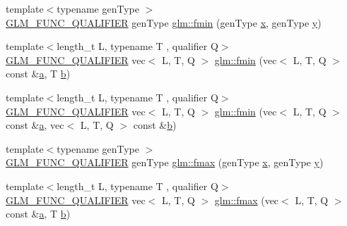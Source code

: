 \begin{DoxyCompactItemize}
\item 
{\footnotesize template$<$typename gen\+Type $>$ }\\\mbox{\hyperlink{setup_8hpp_a33fdea6f91c5f834105f7415e2a64407}{G\+L\+M\+\_\+\+F\+U\+N\+C\+\_\+\+Q\+U\+A\+L\+I\+F\+I\+ER}} gen\+Type \mbox{\hyperlink{group__gtx__extended__min__max_gaa3200559611ac5b9b9ae7283547916a7}{glm\+::fmin}} (gen\+Type \mbox{\hyperlink{_s_d_l__opengl_8h_ad0e63d0edcdbd3d79554076bf309fd47}{x}}, gen\+Type \mbox{\hyperlink{_s_d_l__opengl_8h_a1675d9d7bb68e1657ff028643b4037e3}{y}})
\item 
{\footnotesize template$<$length\+\_\+t L, typename T , qualifier Q$>$ }\\\mbox{\hyperlink{setup_8hpp_a33fdea6f91c5f834105f7415e2a64407}{G\+L\+M\+\_\+\+F\+U\+N\+C\+\_\+\+Q\+U\+A\+L\+I\+F\+I\+ER}} vec$<$ L, T, Q $>$ \mbox{\hyperlink{group__gtx__extended__min__max_gae989203363cff9eab5093630df4fe071}{glm\+::fmin}} (vec$<$ L, T, Q $>$ const \&\mbox{\hyperlink{_s_d_l__opengl__glext_8h_a3309789fc188587d666cda5ece79cf82}{a}}, T \mbox{\hyperlink{_s_d_l__opengl__glext_8h_a0f71581a41fd2264c8944126dabbd010}{b}})
\item 
{\footnotesize template$<$length\+\_\+t L, typename T , qualifier Q$>$ }\\\mbox{\hyperlink{setup_8hpp_a33fdea6f91c5f834105f7415e2a64407}{G\+L\+M\+\_\+\+F\+U\+N\+C\+\_\+\+Q\+U\+A\+L\+I\+F\+I\+ER}} vec$<$ L, T, Q $>$ \mbox{\hyperlink{group__gtx__extended__min__max_ga7c42e93cd778c9181d1cdeea4d3e43bd}{glm\+::fmin}} (vec$<$ L, T, Q $>$ const \&\mbox{\hyperlink{_s_d_l__opengl__glext_8h_a3309789fc188587d666cda5ece79cf82}{a}}, vec$<$ L, T, Q $>$ const \&\mbox{\hyperlink{_s_d_l__opengl__glext_8h_a0f71581a41fd2264c8944126dabbd010}{b}})
\item 
{\footnotesize template$<$typename gen\+Type $>$ }\\\mbox{\hyperlink{setup_8hpp_a33fdea6f91c5f834105f7415e2a64407}{G\+L\+M\+\_\+\+F\+U\+N\+C\+\_\+\+Q\+U\+A\+L\+I\+F\+I\+ER}} gen\+Type \mbox{\hyperlink{group__gtx__extended__min__max_gae5792cb2b51190057e4aea027eb56f81}{glm\+::fmax}} (gen\+Type \mbox{\hyperlink{_s_d_l__opengl_8h_ad0e63d0edcdbd3d79554076bf309fd47}{x}}, gen\+Type \mbox{\hyperlink{_s_d_l__opengl_8h_a1675d9d7bb68e1657ff028643b4037e3}{y}})
\item 
{\footnotesize template$<$length\+\_\+t L, typename T , qualifier Q$>$ }\\\mbox{\hyperlink{setup_8hpp_a33fdea6f91c5f834105f7415e2a64407}{G\+L\+M\+\_\+\+F\+U\+N\+C\+\_\+\+Q\+U\+A\+L\+I\+F\+I\+ER}} vec$<$ L, T, Q $>$ \mbox{\hyperlink{group__gtx__extended__min__max_gab380df808a15a6a23993e3475d1b94d2}{glm\+::fmax}} (vec$<$ L, T, Q $>$ const \&\mbox{\hyperlink{_s_d_l__opengl__glext_8h_a3309789fc188587d666cda5ece79cf82}{a}}, T \mbox{\hyperlink{_s_d_l__opengl__glext_8h_a0f71581a41fd2264c8944126dabbd010}{b}})

\end{DoxyCompactItemize}
